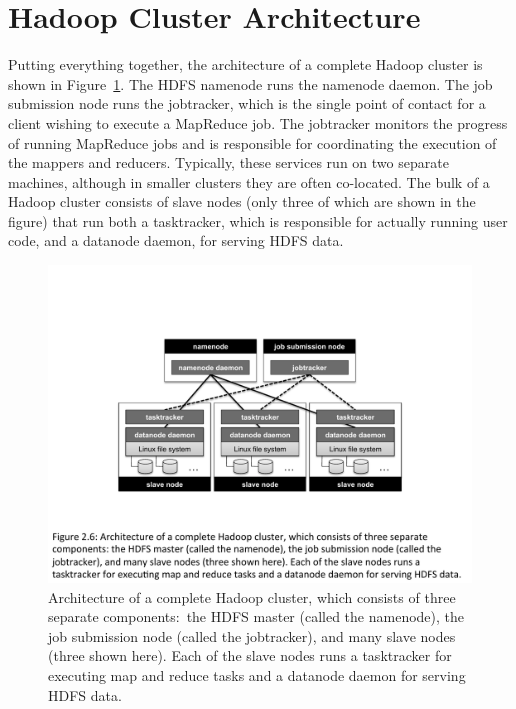 \section{Hadoop Cluster Architecture}
\label{chapter2:cluster-architecture}

Putting everything together, the architecture of a complete Hadoop
cluster is shown in Figure~\ref{figure:chapter2:Hadoop-cluster}.  The
HDFS namenode runs the namenode daemon.  The job submission node runs
the jobtracker, which is the single point of contact for a client
wishing to execute a MapReduce job.  The jobtracker monitors the
progress of running MapReduce jobs and is responsible for coordinating
the execution of the mappers and reducers.  Typically, these services
run on two separate machines, although in smaller clusters they are
often co-located.  The bulk of a Hadoop cluster consists of slave
nodes (only three of which are shown in the figure) that run both a
tasktracker, which is responsible for actually running user code, and
a datanode daemon, for serving HDFS data.

\begin{figure}[t]
\begin{center}
\includegraphics[scale=0.6]{figures/fig-ch2-Hadoop.pdf}
\end{center}
\caption{Architecture of a complete Hadoop cluster, which consists of
  three separate components:\ the HDFS master (called the namenode),
  the job submission node (called the jobtracker), and many slave
  nodes (three shown here).  Each of the slave nodes runs a
  tasktracker for executing map and reduce tasks and a datanode daemon
  for serving HDFS data.}
\label{figure:chapter2:Hadoop-cluster}
\end{figure}

